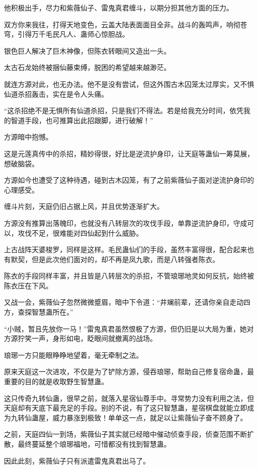 \begin{this_body}
他积极出手，尽力和紫薇仙子、雷鬼真君缠斗，以期分担其他方面的压力。

双方你来我往，打得天地变色，云盖大陆表面面目全非。战斗的轰鸣声，响彻苍穹，引得万千毛民凡人、蛊师心惊胆战。

银色巨人解决了巨木神像，但陈衣转眼间又造出一头。

太古石龙始终被捆仙藤束缚，脱困的希望越来越渺茫。

就连方源对此，也无办法。他不是没有尝试，但这外围古木囚笼太过厚实，又不惧仙道杀招轰击，实在是令人头痛。

“这杀招绝不是无惧所有仙道杀招，只是我们不得法。若是给我充分时间，依凭我的智道手段，也可推算出此招跟脚，进行破解！”

方源暗中抱憾。

这是元莲真传中的杀招，精妙得很，好比是逆流护身印，让天庭等蛊仙一筹莫展，想破脑袋。

方源如今也遭受了这种待遇，碰到古木囚笼，有了之前紫薇仙子面对逆流护身印的心理感受。

缠斗片刻，天庭仍旧占据上风，并且优势逐渐扩大。

方源没有推算出落魄印，也就没有八转层次的攻伐手段，单靠逆流护身印，守成可以，攻伐不足，很难能对四仙起到什么威胁。

上古战阵天婆梭罗，同样是这样。毛民蛊仙们的手段，虽然丰富得很，配合起来也有默契，但是此次他们面对的，却不再是凤九歌，而是八转强者陈衣。

陈衣的手段同样丰富，并且皆是八转层次的杀招，不管琅琊地灵如何反抗，始终被陈衣压在下风。

又战一会，紫薇仙子忽然微微蹙眉，暗中下令道：“井斓前辈，还请你亲自走动四方，查探智慧蛊所在。”

“小贼，暂且先放你一马！”雷鬼真君虽然恨极了方源，但仍旧是以大局为重，她对方源狞笑一声，身形如电，眨眼间就撤离的战场。

琅琊一方只能眼睁睁地望着，毫无牵制之法。

原来天庭这一次进攻，不仅是为了铲除方源，侵吞琅琊，帮助自己修复宿命蛊，最重要的目的就是收取野生智慧蛊。

这只传奇九转仙蛊，很早之前，就落入星宿仙尊手中。寻常势力没有利用之法，但天庭却有天底下最充足的手段。别的不说，有了这只智慧蛊，星宿棋盘就能立即成为九转仙蛊屋，威力暴涨到极致！单单这一点，就足以让紫薇仙子奋不顾身了。

之前，天庭四仙一到场，紫薇仙子其实就已经暗中催动侦查手段，侦查范围不断扩散，最终蔓延整个琅琊福地，可惜都没有找到智慧蛊。

因此此刻，紫薇仙子只有派遣雷鬼真君出马了。


\end{this_body}
